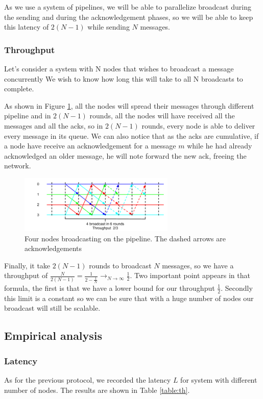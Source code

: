 \documentclass[a4paper]{article}
\begin{document}
As we use a system of pipelines, we will be able to parallelize broadcast
during the sending and during the acknowledgement phases, so we will be able to
keep this latency of $2(N-1)$ while sending $N$ messages.
\subsubsection{Throughput}
Let’s consider a system with N nodes that wishes to broadcast a message concurrently
We wish to know how long this will take to all N broadcasts to
complete.

As shown in Figure \ref{figure:throughput2}, all the nodes will spread their
messages through different pipeline and in $2(N-1)$ rounds, all the
nodes will have received all the messages and all the acks, so in $2(N-1)$ rounds,
every node is able to deliver every message in its queue. We can also notice
that as the acks are cumulative, if a node have receive an acknowledgement for a
message $m$ while he had already acknowledged an older message, he will note
forward the new ack, freeing the network. 

\begin{figure}[h]
    \centering
    \includegraphics[width=280px]{Throughput2.png}
    \caption{Four nodes broadcasting on the pipeline. The dashed arrows are
    acknowledgements}
    \label{figure:throughput2}
\end{figure}

Finally, it take $2(N-1)$ rounds to broadcast $N$ messages, so we have a throughput
of $\frac{N}{2(N-1)}=\frac{1}{2-\frac{1}{N}}\longrightarrow_{N \rightarrow
\infty}\frac{1}{2}$. Two important point appears in that formula, the first is
that we have a lower bound for our throughput $\frac{1}{2}$. Secondly this limit 
is a constant so we can be sure that with a huge number of nodes our broadcast
will still be scalable.

\subsection{Empirical analysis}
\subsubsection{Latency}
As for the previous protocol, we recorded the latency $L$ for system with
different number of nodes. The results are shown in Table \ref{table:th}.
\end{document}
